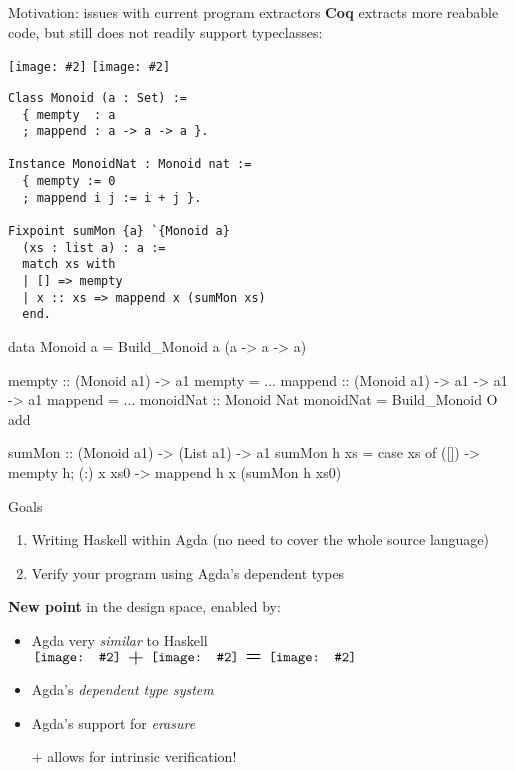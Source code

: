 \documentclass[aspectratio=169]{beamer}
\renewcommand\alert[1]{\textcolor{mLightBrown}{#1}}
\newcommand\img[2]{\texttt{[image: \#2]}}
\newcommand\smallImg[1]{\img{1.7em}{#1}}
\newcommand*\vmid[1]{\vcenter{\hbox{#1}}}
\newcommand\agdaHsLove{%
$
\vmid{\smallImg{agda}}
\vmid{\scalebox{1.5}{\ +\ }}
\vmid{\smallImg{haskell}}
\vmid{\scalebox{1.5}{\ =\ }}
\vmid{\smallImg{heart}}
$
}
\newcommand\resetVars{
  \def\sourceRatio{.5}
  \def\zoom{1}
  \def\hsFontsize{\normalsize}
  \def\midruleL{-1cm}
  \def\midruleR{.5cm}
  \def\sourceIcon{agda}
}
\def\hsSize{\fpeval{1 - \sourceRatio}}
\newcommand\midrule{\hspace{\midruleL}\vrule\hspace{\midruleR}}
\newcommand\codeLogos{%
\hspace{\fpeval{\sourceRatio / 2}\textwidth}
\hspace{-1cm}\img{1cm}{\sourceIcon}
\hspace{\fpeval{(\sourceRatio / 2) + (\hsSize / 2)}\textwidth}
\hspace{-1cm}\img{1cm}{haskell}
}
\begin{document}
\begin{frame}[fragile]{Motivation: issues with current program extractors}
\def\sourceIcon{coq}
\def\modruleL{-.5cm}
\def\hsFontsize{\scriptsize}
\textbf{Coq} extracts more reabable code, but still does not readily support typeclasses:

\codeLogos

\hspace{-.5cm}
\begin{minipage}{.5\textwidth}
\begin{verbatim}
Class Monoid (a : Set) :=
  { mempty  : a
  ; mappend : a -> a -> a }.

Instance MonoidNat : Monoid nat :=
  { mempty := 0
  ; mappend i j := i + j }.

Fixpoint sumMon {a} `{Monoid a}
  (xs : list a) : a :=
  match xs with
  | [] => mempty
  | x :: xs => mappend x (sumMon xs)
  end.
\end{verbatim}
\end{minipage}
\midrule
\begin{minipage}{.5\textwidth}
\begin{haskellcode}
data Monoid a = Build_Monoid a (a -> a -> a)

mempty :: (Monoid a1) -> a1
mempty = ...
mappend :: (Monoid a1) -> a1 -> a1 -> a1
mappend = ...
monoidNat :: Monoid Nat
monoidNat = Build_Monoid O add

sumMon :: (Monoid a1) -> (List a1) -> a1
sumMon h xs = case xs of {
  ([]) -> mempty h;
  (:) x xs0 -> mappend h x (sumMon h xs0)}
\end{haskellcode}
\end{minipage}
\resetVars
\end{frame}

\begin{frame}[fragile]{Goals}
\begin{enumerate}
\item Writing Haskell within Agda (no need to cover the whole source language)
\item Verify your program using Agda's dependent types
\end{enumerate}
\pause
\textbf{New point} in the design space, enabled by:
\begin{itemize}
\item Agda very \textit{similar} to Haskell \hspace{.5cm}\agdaHsLove{}
\item Agda's \textit{dependent type system}
\item Agda's support for \textit{erasure}
\item[+] allows for \alert{intrinsic verification}!
\end{itemize}

\end{frame}
\end{document}

